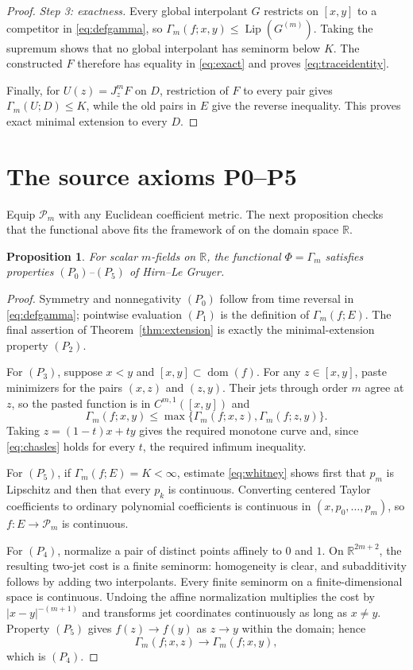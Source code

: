 \documentclass[11pt]{article}
\newtheorem{proposition}[theorem]{Proposition}
\newcommand{\R}{\mathbb R}
\newcommand{\Pm}{\mathcal P_m}
\newcommand{\Lip}{\operatorname{Lip}}
\newcommand{\dom}{\operatorname{dom}}
\newcommand{\J}{J}
\begin{document}
\begin{proof}
\emph{Step 3: exactness.}
Every global interpolant $G$ restricts on $[x,y]$ to a competitor in
\eqref{eq:defgamma}, so
$\Gamma_m(f;x,y)\leq\Lip(G^{(m)})$.  Taking the supremum shows that no
global interpolant has seminorm below $K$.  The constructed $F$ therefore
has equality in \eqref{eq:exact} and proves \eqref{eq:traceidentity}.

Finally, for $U(z)=\J_z^mF$ on $D$, restriction of $F$ to every pair gives
$\Gamma_m(U;D)\leq K$, while the old pairs in $E$ give the reverse
inequality.  This proves exact minimal extension to every $D$.
\end{proof}

\section{The source axioms P0--P5}

Equip $\Pm$ with any Euclidean coefficient metric.  The next proposition
checks that the functional above fits the framework of \cite{HL} on the
domain space $\R$.

\begin{proposition}\label{prop:axioms}
For scalar $m$-fields on $\R$, the functional $\Phi=\Gamma_m$ satisfies
properties $(P_0)$--$(P_5)$ of Hirn--Le Gruyer.
\end{proposition}

\begin{proof}
Symmetry and nonnegativity $(P_0)$ follow from time reversal in
\eqref{eq:defgamma}; pointwise evaluation $(P_1)$ is the definition of
$\Gamma_m(f;E)$.  The final assertion of
Theorem~\ref{thm:extension} is exactly the minimal-extension property
$(P_2)$.

For $(P_3)$, suppose $x<y$ and $[x,y]\subset\dom(f)$.  For any
$z\in[x,y]$, paste minimizers for the pairs $(x,z)$ and $(z,y)$.  Their jets
through order $m$ agree at $z$, so the pasted function is in
$C^{m,1}([x,y])$ and
\begin{equation}\label{eq:chasles}
 \Gamma_m(f;x,y)\leq
 \max\{\Gamma_m(f;x,z),\Gamma_m(f;z,y)\}.
\end{equation}
Taking $z=(1-t)x+ty$ gives the required monotone curve and, since
\eqref{eq:chasles} holds for every $t$, the required infimum inequality.

For $(P_5)$, if $\Gamma_m(f;E)=K<\infty$, estimate
\eqref{eq:whitney} shows first that $p_m$ is Lipschitz and then that every
$p_k$ is continuous.  Converting centered Taylor coefficients to ordinary
polynomial coefficients is continuous in $(x,p_0,\ldots,p_m)$, so
$f:E\to\Pm$ is continuous.

For $(P_4)$, normalize a pair of distinct points affinely to $0$ and $1$.
On $\R^{2m+2}$, the resulting two-jet cost is a finite seminorm: homogeneity
is clear, and subadditivity follows by adding two interpolants.  Every finite
seminorm on a finite-dimensional space is continuous.  Undoing the affine
normalization multiplies the cost by $|x-y|^{-(m+1)}$ and transforms jet
coordinates continuously as long as $x\ne y$.  Property $(P_5)$ gives
$f(z)\to f(y)$ as $z\to y$ within the domain; hence
\[
 \Gamma_m(f;x,z)\longrightarrow\Gamma_m(f;x,y),
\]
which is $(P_4)$.
\end{proof}
\end{document}
